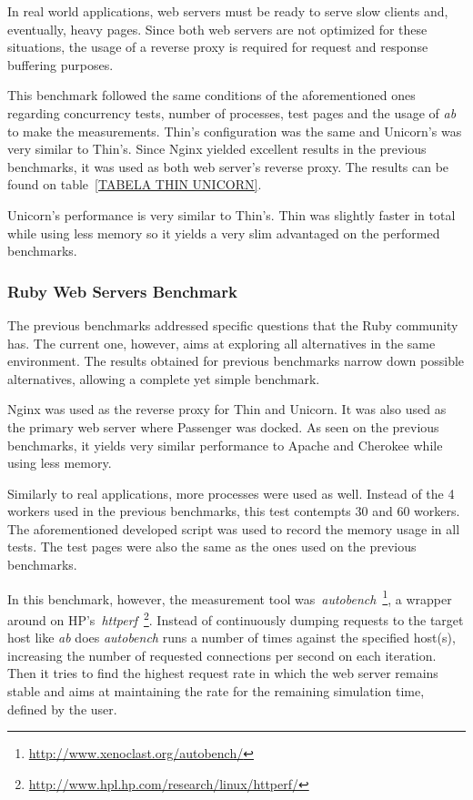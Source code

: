 In real world applications, web servers must be ready to serve slow clients and, eventually, heavy pages. Since both web servers are not optimized for these situations, the usage of a reverse proxy is required for request and response buffering purposes.

This benchmark followed the same conditions of the aforementioned ones regarding concurrency tests, number of processes, test pages and the usage of \textit{ab} to make the measurements. Thin's configuration was the same and Unicorn's was very similar to Thin's. Since Nginx yielded excellent results in the previous benchmarks, it was used as both web server's reverse proxy. The results can be found on table~\ref{TABELA THIN UNICORN}.

Unicorn's performance is very similar to Thin's. Thin was slightly faster in total while using less memory so it yields a very slim advantaged on the performed benchmarks.

\subsubsection{Ruby Web Servers Benchmark}
The previous benchmarks addressed specific questions that the Ruby community has. The current one, however, aims at exploring all alternatives in the same environment. The results obtained for previous benchmarks narrow down possible alternatives, allowing a complete yet simple benchmark. 

Nginx was used as the reverse proxy for Thin and Unicorn. It was also used as the primary web server where Passenger was docked. As seen on the previous benchmarks, it yields very similar performance to Apache and Cherokee while using less memory.

Similarly to real applications, more processes were used as well. Instead of the 4 workers used in the previous benchmarks, this test contempts 30 and 60 workers. The aforementioned developed script was used to record the memory usage in all tests. The test pages were also the same as the ones used on the previous benchmarks.

In this benchmark, however, the measurement tool was~\textit{autobench}~\footnote{\url{http://www.xenoclast.org/autobench/}}, a wrapper around on HP's~\textit{httperf}~\footnote{\url{http://www.hpl.hp.com/research/linux/httperf/}}. Instead of continuously dumping requests to the target host like \textit{ab} does \textit{autobench} runs a number of times against the specified host(s), increasing the number of requested connections per second on each iteration. Then it tries to find the highest request rate in which the web server remains stable and aims at maintaining the rate for the remaining simulation time, defined by the user.

